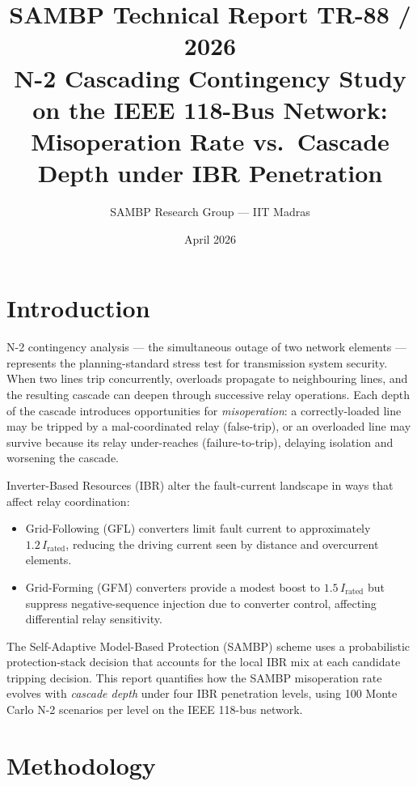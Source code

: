 \documentclass[11pt,a4paper]{article}
\title{%
  {\color{sambpblue}\large SAMBP Technical Report TR-88 / 2026}\\[6pt]
  {\bfseries N-2 Cascading Contingency Study on the IEEE 118-Bus Network:\\
   Misoperation Rate vs.\ Cascade Depth under IBR Penetration}
}
\author{SAMBP Research Group — IIT Madras}
\date{April 2026}
\begin{document}
\maketitle
\tableofcontents
\clearpage

\section{Introduction}

N-2 contingency analysis — the simultaneous outage of two network elements —
represents the planning-standard stress test for transmission system security.
When two lines trip concurrently, overloads propagate to neighbouring lines,
and the resulting cascade can deepen through successive relay operations.
Each depth of the cascade introduces opportunities for \emph{misoperation}:
a correctly-loaded line may be tripped by a mal-coordinated relay
(false-trip), or an overloaded line may survive because its relay
under-reaches (failure-to-trip), delaying isolation and worsening the cascade.

Inverter-Based Resources (IBR) alter the fault-current landscape in ways that
affect relay coordination:
\begin{itemize}
  \item Grid-Following (GFL) converters limit fault current to approximately
        $1.2\,I_\text{rated}$, reducing the driving current seen by
        distance and overcurrent elements.
  \item Grid-Forming (GFM) converters provide a modest boost to
        $1.5\,I_\text{rated}$ but suppress negative-sequence injection
        due to converter control, affecting differential relay sensitivity.
\end{itemize}

The Self-Adaptive Model-Based Protection (SAMBP) scheme uses a probabilistic
protection-stack decision that accounts for the local IBR mix at each
candidate tripping decision.  This report quantifies how the SAMBP misoperation
rate evolves with \emph{cascade depth} under four IBR penetration levels,
using 100 Monte Carlo N-2 scenarios per level on the IEEE 118-bus network.

\section{Methodology}
\end{document}
